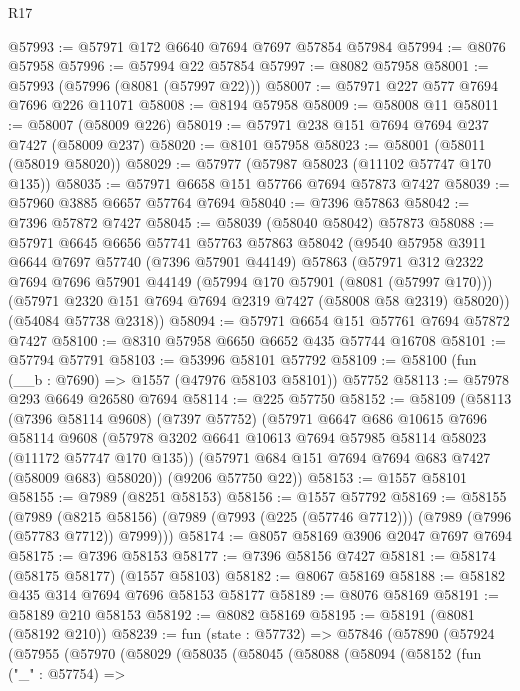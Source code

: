 \begin{lexlean}{R17}
\begin{coremodule}
@57993 := @57971 @172 @6640 @7694 @7697 @57854 @57984
@57994 := @8076 @57958
@57996 := @57994 @22 @57854
@57997 := @8082 @57958
@58001 := @57993 (@57996 (@8081 (@57997 @22)))
@58007 := @57971 @227 @577 @7694 @7696 @226 @11071
@58008 := @8194 @57958
@58009 := @58008 @11
@58011 := @58007 (@58009 @226)
@58019 := @57971 @238 @151 @7694 @7694 @237 @7427 (@58009 @237)
@58020 := @8101 @57958
@58023 := @58001 (@58011 (@58019 @58020))
@58029 := @57977 (@57987 @58023 (@11102 @57747 @170 @135))
@58035 := @57971 @6658 @151 @57766 @7694 @57873 @7427
@58039 := @57960 @3885 @6657 @57764 @7694
@58040 := @7396 @57863
@58042 := @7396 @57872 @7427
@58045 := @58039 (@58040 @58042) @57873
@58088 := @57971
    @6645
    @6656
    @57741
    @57763
    @57863
    @58042
    (@9540
      @57958
      @3911
      @6644
      @7697
      @57740
      (@7396 @57901 @44149)
      @57863
      (@57971
        @312
        @2322
        @7694
        @7696
        @57901
        @44149
        (@57994 @170 @57901 (@8081 (@57997 @170)))
        (@57971 @2320 @151 @7694 @7694 @2319 @7427 (@58008 @58 @2319) @58020))
      (@54084 @57738 @2318))
@58094 := @57971 @6654 @151 @57761 @7694 @57872 @7427
@58100 := @8310 @57958 @6650 @6652 @435 @57744 @16708
@58101 := @57794 @57791
@58103 := @53996 @58101 @57792
@58109 := @58100 (fun (__b : @7690) => @1557 (@47976 @58103 @58101)) @57752
@58113 := @57978 @293 @6649 @26580 @7694
@58114 := @225 @57750
@58152 := @58109
    (@58113
      (@7396 @58114 @9608)
      (@7397 @57752)
      (@57971
        @6647
        @686
        @10615
        @7696
        @58114
        @9608
        (@57978 @3202 @6641 @10613 @7694 @57985 @58114 @58023 (@11172 @57747 @170 @135))
        (@57971 @684 @151 @7694 @7694 @683 @7427 (@58009 @683) @58020))
      (@9206 @57750 @22))
@58153 := @1557 @58101
@58155 := @7989 (@8251 @58153)
@58156 := @1557 @57792
@58169 := @58155
    (@7989
      (@8215 @58156)
      (@7989 (@7993 (@225 (@57746 @7712))) (@7989 (@7996 (@57783 @7712)) @7999)))
@58174 := @8057 @58169 @3906 @2047 @7697 @7694
@58175 := @7396 @58153
@58177 := @7396 @58156 @7427
@58181 := @58174 (@58175 @58177) (@1557 @58103)
@58182 := @8067 @58169
@58188 := @58182 @435 @314 @7694 @7696 @58153 @58177
@58189 := @8076 @58169
@58191 := @58189 @210 @58153
@58192 := @8082 @58169
@58195 := @58191 (@8081 (@58192 @210))
@58239 := fun (state : @57732) =>
  @57846
    (@57890
      (@57924
        (@57955
          (@57970
            (@58029
              (@58035
                (@58045
                  (@58088
                    (@58094
                      (@58152
                        (fun ("_" : @57754) =>

\end{coremodule}
\end{lexlean}
